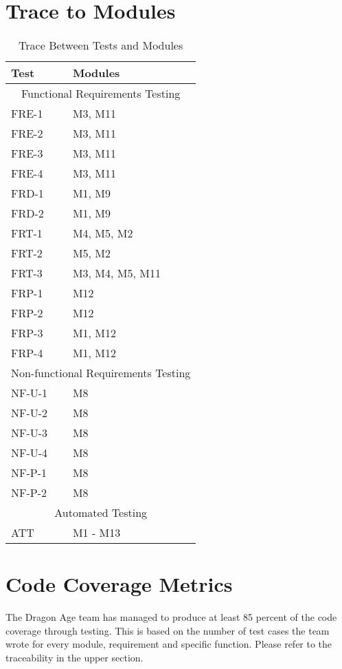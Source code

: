 \documentclass[12,english]{article}
\begin{document}
		\FloatBarrier
		\newpage

\section{Trace to Modules}
\begin{table}[!htbp]
	\begin{tabular}{ll}
		\toprule
		Test & Modules \\
				\midrule
				\multicolumn{2}{c}{Functional Requirements Testing} \\
				\midrule
				FRE-1 & M3, M11 \\
				FRE-2 & M3, M11 \\
				FRE-3 & M3, M11 \\
				FRE-4 & M3, M11 \\
				FRD-1 & M1, M9 \\
				FRD-2 & M1, M9 \\
				FRT-1 & M4, M5, M2 \\
				FRT-2 & M5, M2 \\
				FRT-3 & M3, M4, M5, M11 \\
				FRP-1 & M12 \\
				FRP-2 & M12 \\
				FRP-3 & M1, M12 \\
				FRP-4 & M1, M12 \\
				\midrule
				\multicolumn{2}{c}{Non-functional Requirements Testing} \\
				\midrule
				NF-U-1 & M8 \\
				NF-U-2 & M8 \\
				NF-U-3 & M8 \\
				NF-U-4 & M8 \\
				NF-P-1 & M8 \\
				NF-P-2 & M8 \\
				
				\midrule
				\multicolumn{2}{c}{Automated Testing} \\
				\midrule
				ATT & M1 - M13\\
		\bottomrule
	\end{tabular}
	\caption{Trace Between Tests and Modules}
	\makeatletter
	\def\rulecolor#1#{\CT@arc{#1}}
	\def\CT@arc#1#2{%
		\ifdim\baselineskip=\z@\noalign\fi
		{\gdef\CT@arc@{\color#1{#2}}}}
	\let\CT@arc@\relax
	\makeatother
	\label{Table}
\end{table}

\FloatBarrier

\section{Code Coverage Metrics}
The Dragon Age team has managed to produce at least 85 percent of the code coverage through testing. This is based on the number of test cases the team wrote for every module, requirement and specific function. Please refer to the traceability in the upper section.
\end{document}
